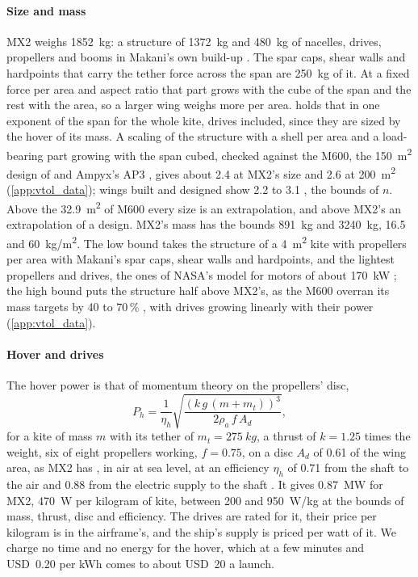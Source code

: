 \paragraph{Size and mass} MX2 weighs \SI{1852}{kg}: a structure of \SI{1372}{kg} and \SI{480}{kg} of nacelles, drives, propellers and booms in Makani's own build-up \citep{echeverri2020part2}. The spar caps, shear walls and hardpoints that carry the tether force across the span are \SI{250}{kg} of it. At a fixed force per area and aspect ratio that part grows with the cube of the span \citep{aull2020} and the rest with the area, so a larger wing weighs more per area.  holds that in one exponent of the span for the whole kite, drives included, since they are sized by the hover of its mass. A scaling of the structure with a shell per area and a load-bearing part growing with the span cubed, checked against the M600, the \SI{150}{m^2} design of \citet{eijkelhof2020reference} and Ampyx's AP3 \citep{vanhagen2023}, gives about 2.4 at MX2's size and 2.6 at \SI{200}{m^2} (\cref{app:vtol_data}); wings built and designed show 2.2 to 3.1 \citep{sommerfeld2022scaling,vanhagen2023,noth2008}, the bounds of $n$. Above the \SI{32.9}{m^2} of M600 every size is an extrapolation, and above MX2's an extrapolation of a design. MX2's mass has the bounds \SI{891}{kg} and \SI{3240}{kg}, 16.5 and \SI{60}{kg/m^2}. The low bound takes the structure of a \SI{4}{m^2} kite with propellers per area \citep{aull2020} with Makani's spar caps, shear walls and hardpoints, and the lightest propellers and drives, the ones of NASA's model for motors of about \SI{170}{kW} \citep{johnson2018}; the high bound puts the structure half above MX2's, as the M600 overran its mass targets by 40 to 70\,\% \citep{echeverri2020part1}, with drives growing linearly with their power (\cref{app:vtol_data}).

\paragraph{Hover and drives} The hover power is that of momentum theory on the propellers' disc,
\begin{equation}
P_h = \frac{1}{\eta_h}\sqrt{\frac{\left(k\,g\,(m + m_t)\right)^3}{2\rho_a\, f\, A_d}},
\label{eq:hover_power}
\end{equation}
for a kite of mass $m$ with its tether of $m_t=\SI{275}{kg}$, a thrust of $k=1.25$ times the weight, six of eight propellers working, $f=0.75$, on a disc $A_d$ of 0.61 of the wing area, as MX2 has \citep{echeverri2020part1}, in air at sea level, at an efficiency $\eta_h$ of 0.71 from the shaft to the air and 0.88 from the electric supply to the shaft \citep{makani2020code}. It gives \SI{0.87}{MW} for MX2, \SI{470}{W} per kilogram of kite, between 200 and \SI{950}{W/kg} at the bounds of mass, thrust, disc and efficiency. The drives are rated for it, their price per kilogram is in the airframe's, and the ship's supply is priced per watt of it. We charge no time and no energy for the hover, which at a few minutes and USD~0.20 per kWh comes to about USD~20 a launch.

